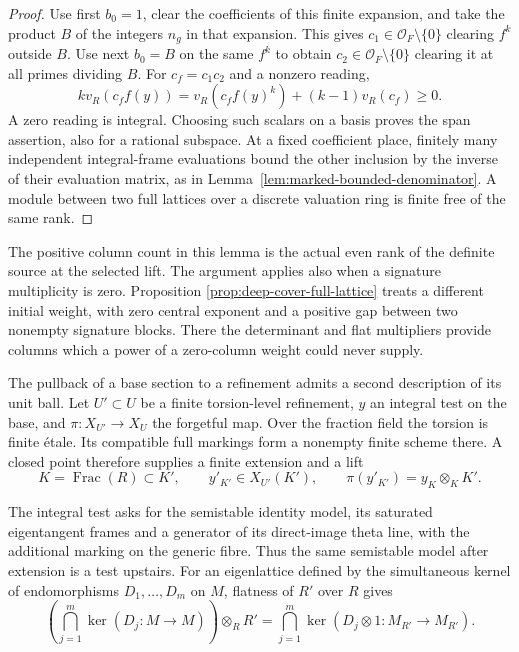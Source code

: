 \begin{proof}
Use first \(b_0=1\), clear the coefficients of this finite
expansion, and take the product \(B\) of the integers \(n_g\)
in that expansion. This gives \(c_1\in\mathcal O_F\setminus\{0\}\)
clearing \(f^k\) outside \(B\). Use next \(b_0=B\) on the same
\(f^k\) to obtain \(c_2\in\mathcal O_F\setminus\{0\}\) clearing
it at all primes dividing \(B\). For \(c_f=c_1c_2\) and a
nonzero reading,
\[
       k v_R(c_ff(y))
          =v_R(c_ff(y)^k)+(k-1)v_R(c_f)\ge0 .
\]
A zero reading is integral. Choosing such scalars on a basis
proves the span assertion, also for a rational subspace.
At a fixed coefficient place, finitely many independent
integral-frame evaluations bound the other inclusion by the inverse
of their evaluation matrix, as in
Lemma~\ref{lem:marked-bounded-denominator}. A module between two
full lattices over a discrete valuation ring is finite free of the
same rank.
\end{proof}

The positive column count in this lemma is the actual even rank
of the definite source at the selected lift. The argument applies
also when a signature multiplicity is zero. Proposition
\ref{prop:deep-cover-full-lattice} treats a different initial
weight, with zero central exponent and a positive gap between
two nonempty signature blocks. There the determinant and flat
multipliers provide columns which a power of a zero-column
weight could never supply.

The pullback of a base section to a refinement admits a second
description of its unit ball. Let \(U'\subset U\) be a finite
torsion-level refinement, \(y\) an integral test on the base,
and \(\pi:X_{U'}\to X_U\) the forgetful map. Over the fraction
field the torsion is finite \'etale. Its compatible full
markings form a nonempty finite scheme there. A closed point
therefore supplies a finite extension and a lift
\[
      K=\operatorname{Frac}(R)\subset K',\qquad
      y'_{K'}\in X_{U'}(K'),\qquad
      \pi(y'_{K'})=y_K\otimes_K K'.
\]

The integral test asks for the semistable identity model, its
saturated eigentangent frames and a generator of its direct-image
theta line, with the additional marking on the generic fibre.
Thus the same semistable model after extension is a test
upstairs. For an eigenlattice defined by the simultaneous
kernel of endomorphisms \(D_1,\ldots,D_m\) on \(M\), flatness
of \(R'\) over \(R\) gives
\[
 \left(\bigcap_{j=1}^m\ker(D_j:M\to M)\right)\otimes_R R'
       =\bigcap_{j=1}^m\ker(D_j\otimes1:M_{R'}\to M_{R'}) .
\]

